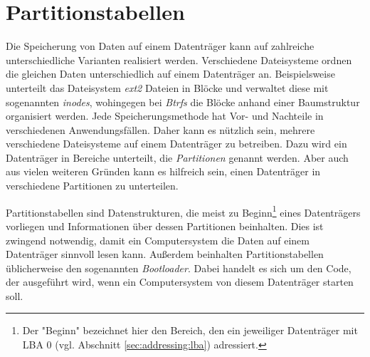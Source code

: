 \section{Partitionstabellen}
Die Speicherung von Daten auf einem Datenträger kann auf zahlreiche unterschiedliche Varianten realisiert werden.
Verschiedene Dateisysteme ordnen die gleichen Daten unterschiedlich auf einem Datenträger an.
Beispielsweise unterteilt das Dateisystem \textit{ext2} Dateien in Blöcke und verwaltet diese mit sogenannten \textit{inodes}, wohingegen bei \textit{Btrfs} die Blöcke anhand einer Baumstruktur organisiert werden. 
Jede Speicherungsmethode hat Vor- und Nachteile in verschiedenen Anwendungsfällen. Daher kann es nützlich sein, mehrere verschiedene Dateisysteme auf einem Datenträger zu betreiben.
Dazu wird ein Datenträger in Bereiche unterteilt, die \textit{Partitionen} genannt werden.
Aber auch aus vielen weiteren Gründen kann es hilfreich sein, einen Datenträger in verschiedene Partitionen zu unterteilen.

Partitionstabellen sind Datenstrukturen, die meist zu Beginn\footnote{
    Der "Beginn" bezeichnet hier den Bereich, den ein jeweiliger Datenträger mit LBA 0 (vgl. Abschnitt \ref{sec:addressing:lba}) adressiert.
}
eines Datenträgers vorliegen und Informationen über dessen Partitionen beinhalten.
Dies ist zwingend notwendig, damit ein Computersystem die Daten auf einem Datenträger sinnvoll lesen kann.
Außerdem beinhalten Partitionstabellen üblicherweise den sogenannten \textit{Bootloader}. Dabei handelt es sich um den Code, der ausgeführt wird, wenn ein Computersystem von diesem Datenträger starten soll.